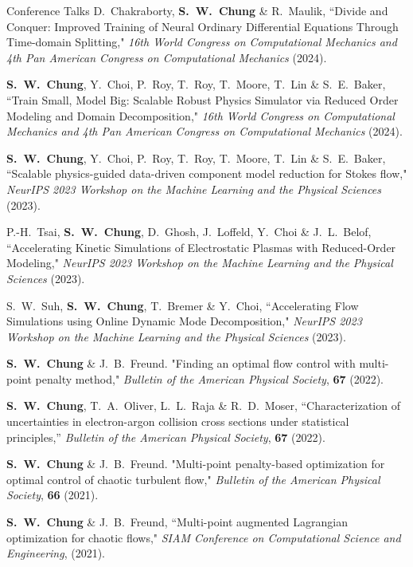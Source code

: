 \documentclass{resume} %
\begin{document}
\begin{rSection}{Conference Talks}
D.\ Chakraborty, \textbf{S.\ W.\ Chung} \& R.\ Maulik,
``Divide and Conquer: Improved Training of Neural Ordinary Differential Equations Through Time-domain Splitting,"
\textit{16th World Congress on Computational Mechanics and 4th Pan American Congress on Computational Mechanics} (2024).
\par
\textbf{S.\ W.\ Chung}, Y.\ Choi, P.\ Roy, T.\ Roy, T.\ Moore, T.\ Lin \& S.\ E.\ Baker,
``Train Small, Model Big: Scalable Robust Physics Simulator via Reduced Order Modeling and Domain Decomposition,"
\textit{16th World Congress on Computational Mechanics and 4th Pan American Congress on Computational Mechanics} (2024).
\par
\textbf{S.\ W.\ Chung}, Y.\ Choi, P.\ Roy, T.\ Roy, T.\ Moore, T.\ Lin \& S.\ E.\ Baker,
``Scalable physics-guided data-driven component model reduction for Stokes flow,"
\textit{NeurIPS 2023 Workshop on the Machine Learning and the Physical Sciences} (2023).
\par
P.-H.\ Tsai, \textbf{S.\ W.\ Chung}, D.\ Ghosh, J.\ Loffeld, Y.\ Choi \& J.\ L.\ Belof,
``Accelerating Kinetic Simulations of Electrostatic Plasmas with Reduced-Order Modeling,"
\textit{NeurIPS 2023 Workshop on the Machine Learning and the Physical Sciences} (2023).
\par
S.\ W.\ Suh, \textbf{S.\ W.\ Chung}, T.\ Bremer \& Y.\ Choi,
``Accelerating Flow Simulations using Online Dynamic Mode Decomposition,"
\textit{NeurIPS 2023 Workshop on the Machine Learning and the Physical Sciences} (2023).
\par

\textbf{S.\ W.\ Chung} \& J.\ B.\ Freund. "Finding an optimal flow control with multi-point penalty method,"
\textit{Bulletin of the American Physical Society}, \textbf{67} (2022).

\par
\textbf{S.\ W.\ Chung}, T.\ A.\ Oliver, L.\ L.\ Raja \& R.\ D.\ Moser,  ``Characterization of uncertainties in electron-argon collision cross sections under statistical principles,''
\textit{Bulletin of the American Physical Society}, \textbf{67} (2022).

\par
\textbf{S.\ W.\ Chung} \& J.\ B.\ Freund. "Multi-point penalty-based optimization for optimal control of chaotic turbulent flow,"
\textit{Bulletin of the American Physical Society}, \textbf{66} (2021).

\par
\textbf{S.\ W.\ Chung} \& J.\ B.\ Freund, ``Multi-point augmented Lagrangian optimization for chaotic flows,"
\textit{SIAM Conference on Computational Science and Engineering}, (2021).


\end{rSection}
\end{document}
